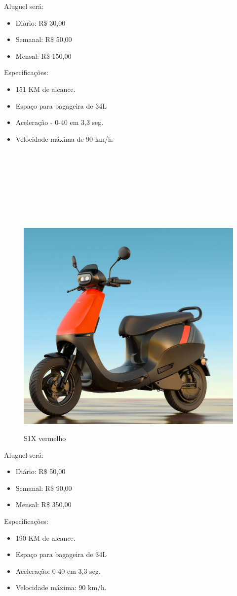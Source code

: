 Aluguel será: 

\begin{itemize}
    \item Diário: R\$ 30,00
    \item Semanal: R\$ 50,00
    \item Mensal: R\$ 150,00
\end{itemize}

Especificações:

\begin{itemize}
    \item 151 KM de alcance.
    \item Espaço para bagageira de 34L
    \item Aceleração - 0-40 em 3,3 seg.
    \item Velocidade máxima de 90 km/h.\\\\\\\\\\\\\\\\\\
\end{itemize}

\begin{figure} [!ht]
    {\centering
    \caption{S1X vermelho}
    \includegraphics[height=0.2\linewidth]{figuras/S1X.png}
    \label{fig:enter-label}
    }
\end{figure}

Aluguel será: 
\begin{itemize}
    \item Diário: R\$ 50,00
    \item Semanal: R\$ 90,00
    \item Mensal: R\$ 350,00
\end{itemize}

Especificações:
\begin{itemize}
    \item 190 KM de alcance.
    \item Espaço para bagageira de 34L
    \item Aceleração: 0-40 em 3,3 seg.
    \item Velocidade máxima: 90 km/h.
\end{itemize}

